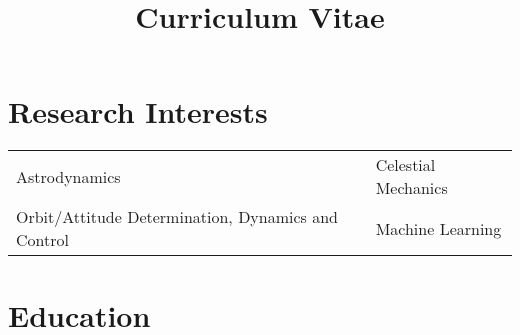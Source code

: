 \documentclass[10pt,a4paper,times]{moderncv}
\title{Curriculum Vitae}
\begin{document}
\makecvtitle
\vspace{-35 pt}




\section{Research Interests}
\begin{tabular}{ll}
Astrodynamics  \hspace{12em} & Celestial Mechanics \\
Orbit/Attitude Determination, Dynamics and Control \hspace{12em} & Machine Learning \\
\end{tabular}



\section{Education}
\end{document}
